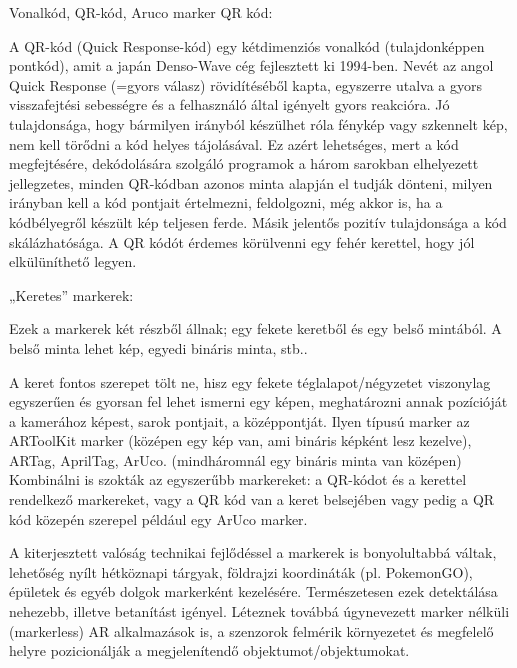 


Vonalkód, QR-kód, Aruco marker
QR kód:

A QR-kód (Quick Response-kód) egy kétdimenziós vonalkód (tulajdonképpen pontkód), amit a japán Denso-Wave cég fejlesztett ki 1994-ben. Nevét az angol Quick Response (=gyors válasz) rövidítéséből kapta, egyszerre utalva a gyors visszafejtési sebességre és a felhasználó által igényelt gyors reakcióra. 
Jó tulajdonsága, hogy bármilyen irányból készülhet róla fénykép vagy szkennelt kép, nem kell törődni a kód helyes tájolásával. Ez azért lehetséges, mert a kód megfejtésére, dekódolására szolgáló programok a három sarokban elhelyezett jellegzetes, minden QR-kódban azonos minta alapján el tudják dönteni, milyen irányban kell a kód pontjait értelmezni, feldolgozni, még akkor is, ha a kódbélyegről készült kép teljesen ferde. 
Másik jelentős pozitív tulajdonsága a kód skálázhatósága.
A QR kódót érdemes körülvenni egy fehér kerettel, hogy jól elkülüníthető legyen.

„Keretes” markerek:

Ezek a markerek két részből állnak; egy fekete keretből és egy belső mintából. A belső minta lehet kép, egyedi bináris minta, stb..

A keret fontos szerepet tölt ne, hisz egy fekete téglalapot/négyzetet viszonylag egyszerűen és gyorsan fel lehet ismerni egy képen, meghatározni annak pozícióját a kamerához képest, sarok pontjait, a középpontját.
Ilyen típusú marker az ARToolKit marker (középen egy kép van, ami bináris képként lesz kezelve), ARTag, AprilTag, ArUco. (mindháromnál egy bináris minta van középen)
Kombinálni is szokták az egyszerűbb markereket: a QR-kódot és a kerettel rendelkező markereket, vagy a QR kód van a keret belsejében vagy pedig a QR kód közepén szerepel például egy ArUco marker.



A kiterjesztett valóság technikai fejlődéssel a markerek is bonyolultabbá váltak, lehetőség nyílt hétköznapi tárgyak, földrajzi koordináták (pl. PokemonGO), épületek és egyéb dolgok markerként kezelésére. Természetesen ezek detektálása nehezebb, illetve betanítást igényel.
Léteznek továbbá úgynevezett marker nélküli (markerless) AR alkalmazások is, a szenzorok felmérik környezetet és megfelelő helyre pozicionálják a megjelenítendő objektumot/objektumokat. 

